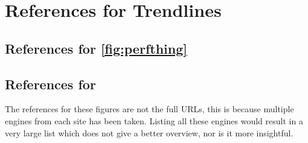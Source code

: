\chapter{References for Trendlines}

\section{References for \autoref{fig:perfthing}}
\label{sec:refvoorgev}

\section{References for }

The references for these figures are not the full URLs, this is because multiple engines from each site has been taken. Listing all these engines would result in a very large list which does not give a better overview, nor is it more insightful.

